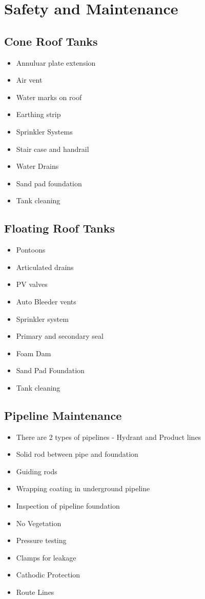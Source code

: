 \documentclass{report}
\begin{document}
	\section{Safety and Maintenance}
	\subsection{Cone Roof Tanks}
	\begin{itemize}
		\item Annuluar plate extension
		\item Air vent
		\item Water marks on roof 
		\item Earthing strip
		\item Sprinkler Systems
		\item Stair case and handrail
		\item Water Drains
		\item Sand pad foundation
		\item Tank cleaning
	\end{itemize}
	\subsection{Floating Roof Tanks}
	\begin{itemize}
		\item Pontoons
		\item Articulated drains
		\item PV valves
		\item Auto Bleeder vents
		\item Sprinkler system
		\item Primary and secondary seal
		\item Foam Dam
		\item Sand Pad Foundation
		\item Tank cleaning
	\end{itemize}
	\subsection{Pipeline Maintenance}
	\begin{itemize}
		\item There are 2 types of pipelines - Hydrant and Product lines
		\item Solid rod between pipe and foundation
		\item Guiding rods
		\item Wrapping coating in underground pipeline
		\item Inspection of pipeline foundation
		\item No Vegetation
		\item Pressure testing
		\item Clamps for leakage
		\item Cathodic Protection
		\item Route Lines
	\end{itemize}
\end{document}
